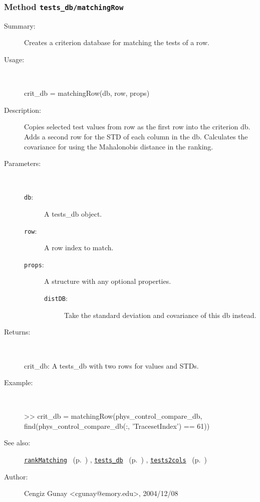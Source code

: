 \subsubsection[Method \texttt{matchingRow}]{Method \texttt{tests\_db/matchingRow}}%
%
\label{ref_tests_db__matchingRow}%
\hypertarget{ref_tests_db__matchingRow}{}%
\begin{description}
\item[Summary:]Creates a criterion database for matching the tests of a row.
%
\item[Usage:]~%
\begin{lyxcode}%
crit\_db = matchingRow(db, row, props)
%
\end{lyxcode}%
%
\item[Description:]%
Copies selected test values from row as the first row into the criterion
 db. Adds a second row for the STD of each column in the db.  Calculates the
 covariance for using the Mahalonobis distance in the ranking.
\item[Parameters:]~
\begin{description}%
\item[\texttt{db}:]
 A tests\_db object.
\item[\texttt{row}:]
 A row index to match.
\item[\texttt{props}:]
 A structure with any optional properties.
\begin{description}%
\item[\texttt{distDB}:]
 Take the standard deviation and covariance of this db instead.
\end{description}%
\end{description}%
%
\item[Returns:]~

	crit\_db: A tests\_db with two rows for values and STDs.
%
\item[Example:]~
\begin{lyxcode}        >> crit\_db = matchingRow(phys\_control\_compare\_db, \\%
                find(phys\_control\_compare\_db(:, 'TracesetIndex') == 61))\\%
\end{lyxcode}
%
\item[See also:]%
\hyperlink{ref_rankMatching}{\texttt{rankMatching}}%
\ (p.~\pageref{ref_rankMatching})%
%
, \hyperlink{ref_tests_db}{\texttt{tests\_db}}%
\ (p.~\pageref{ref_tests_db})%
%
, \hyperlink{ref_tests2cols}{\texttt{tests2cols}}%
\ (p.~\pageref{ref_tests2cols})%
%
%
\item[Author:]%
Cengiz Gunay <cgunay@emory.edu>, 2004/12/08%
\end{description}
\methodline%
